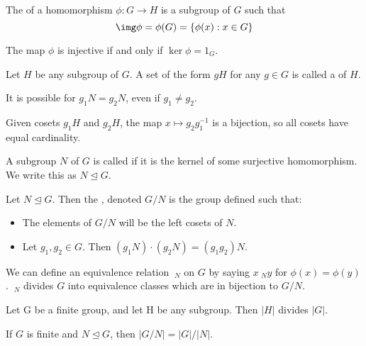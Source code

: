 \documentclass{article}
\begin{document}
\begin{defn}
  The  of a homomorphism $\phi : G \rightarrow H$ is a subgroup of $G$ such that
  $$\img \phi = \phi(G) = \{\phi(x) : x \in G \}$$
\end{defn}

\begin{prop}
  The map $\phi$ is injective if and only if $\ker \phi = {1_G}$. 
\end{prop}

\begin{defn}
  Let $H$ be any subgroup of $G$. A set of the form $gH$ for any $g \in G$ is called a
   of $H$. 
\end{defn}

\begin{remark}
  It is possible for $g_1N = g_2N$, even if $g_1 \neq g_2$. 
\end{remark}

\begin{remark}
  Given cosets $g_1H$ and $g_2H$, the map $x \mapsto g_2g_1^{-1}$ is a bijection, so
  all cosets have equal cardinality. 
\end{remark}

\begin{defn}
  A subgroup $N$ of $G$ is called  if it is the kernel of some surjective
  homomorphism. We write this as $N \trianglelefteq G$. 
\end{defn}

\begin{defn}
  Let $N \trianglelefteq G$. Then the , denoted $G/N$ is
  the group defined such that:
  \begin{itemize}
    \item The elements of $G/N$ will be the left cosets of $N$.
    \item Let $g_1, g_2 \in G$. Then $(g_1N) \cdot (g_2N) = (g_1g_2)N$. 
  \end{itemize}
\end{defn}

\begin{remark}
  We can define an equivalence relation $~_N$ on $G$ by saying $x ~_N y$ for
  $\phi(x) = \phi(y)$. $~_N$ divides $G$ into equivalence classes which are
  in bijection to $G/N$. 
\end{remark}

\begin{nthm}
  Let G be a finite group, and let H be any subgroup. Then $|H|$ divides $|G|$. 
\end{nthm}

\begin{remark}
  If $G$ is finite and $N \trianglelefteq G$, then $|G/N| = |G|/|N|$. 
\end{remark}
\end{document}
